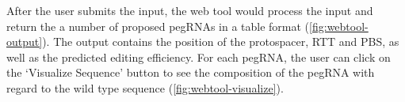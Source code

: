 
After the user submits the input, the web tool would process the input and return the a number of proposed pegRNAs in a table format (\autoref{fig:webtool-output}). The output contains the position of the protospacer, RTT and PBS, as well as the predicted editing efficiency. For each pegRNA, the user can click on the `Visualize Sequence' button to see the composition of the pegRNA with regard to the wild type sequence (\autoref{fig:webtool-visualize}).